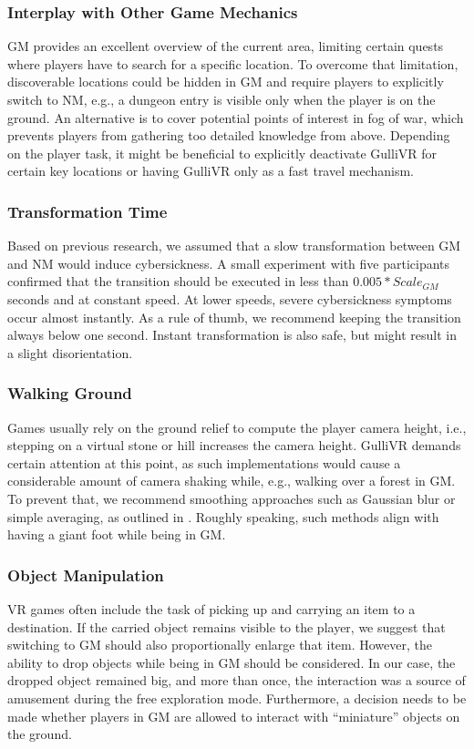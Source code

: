 \documentclass{sigchi}
\begin{document}
\subsubsection{Interplay with Other Game Mechanics}
GM provides an excellent overview of the current area, limiting certain quests where players have to search for a specific location. To overcome that limitation, discoverable locations could be hidden in GM and require players to explicitly switch to NM, e.g., a dungeon entry is visible only when the player is on the ground. An alternative is to cover potential points of interest in fog of war, which prevents players from gathering too detailed knowledge from above. Depending on the player task, it might be beneficial to explicitly deactivate GulliVR for certain key locations or having GulliVR only as a fast travel mechanism. 


\subsubsection{Transformation Time}
Based on previous research, we assumed that a slow transformation between GM and NM would induce cybersickness. A small experiment with five participants confirmed that the transition should be executed in less than $0.005 * Scale_{GM}$ seconds and at constant speed. At lower speeds, severe cybersickness symptoms occur almost instantly. As a rule of thumb, we recommend keeping the transition always below one second. Instant transformation is also safe, but might result in a slight disorientation.



\subsubsection{Walking Ground}
Games usually rely on the ground relief to compute the player camera height, i.e., stepping on a virtual stone or hill increases the camera height. GulliVR demands certain attention at this point, as such implementations would cause a considerable amount of camera shaking while, e.g., walking over a forest in GM. To prevent that, we recommend smoothing approaches such as Gaussian blur or simple averaging, as outlined in . Roughly speaking, such methods align with having a giant foot while being in GM.

\subsubsection{Object Manipulation}
VR games often include the task of picking up and carrying an item to a destination. If the carried object remains visible to the player, we suggest that switching to GM should also proportionally enlarge that item. However, the ability to drop objects while being in GM should be considered. In our case, the dropped object remained big, and more than once, the interaction was a source of amusement during the free exploration mode. Furthermore, a decision needs to be made whether players in GM are allowed to interact with ``miniature'' objects on the ground.
\end{document}
